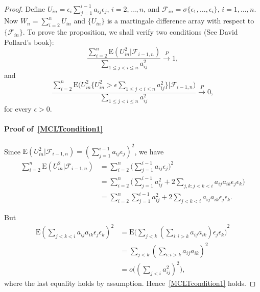 \documentclass[review]{elsarticle}
\theoremstyle{plain}
\theoremstyle{definition}
\theoremstyle{remark}
\begin{document}
 \begin{proof}
     Define $U_{in} =\epsilon_i \sum_{j=1}^{i-1} a_{ij}\epsilon_j$, $i=2,\ldots,n$, and $\mathcal{F}_{in}=\sigma\{\epsilon_1,\ldots,\epsilon_i\}$, $i=1,\ldots, n$.
     Now $W_n=\sum_{i=2}^n U_{in}$ and $\{U_{in}\}$ is a martingale difference array with respect to $\{\mathcal{F}_{in}\}$. 
     To prove the proposition, we shall verify two conditions (See David Pollard's book):
     \begin{equation}\label{MCLTcondition1}
         \frac{\sum_{i=2}^n \mathrm{E}(U_{in}^2 |\mathcal{F}_{i-1,n})}{\sum_{1\leq j<i\leq n} a_{ij}^2}\xrightarrow{P} 1,
     \end{equation}
     and
     \begin{equation}\label{MCLTcondition2}
         \frac{\sum_{i=2}^n \mathrm{E}\big(U_{in}^2\big\{U_{in}^2>\epsilon \sum_{1\leq j<i\leq n} a_{ij}^2\big\}\big|\mathcal{F}_{i-1,n}\big)}{\sum_{1\leq j<i\leq n} a_{ij}^2}\xrightarrow{P} 0,
     \end{equation}
     for every $\epsilon>0$.

     \paragraph{Proof of~\eqref{MCLTcondition1}}
     Since $\mathrm{E}(U_{in}^2 |\mathcal{F}_{i-1,n})={(\sum_{j=1}^{i-1}a_{ij}\epsilon_j)}^2$, we have
     \begin{equation*}
         \begin{aligned}
\sum_{i=2}^n \mathrm{E}(U_{in}^2 |\mathcal{F}_{i-1,n})
             &=\sum_{i=2}^n \big(\sum_{j=1}^{i-1}a_{ij}\epsilon_j \big)^2\\
             &=\sum_{i=2}^n \big( \sum_{j=1}^{i-1} a_{ij}^2 +2\sum_{j,k:j<k<i} a_{ij}a_{ik}\epsilon_j \epsilon_k \big)\\
             &=\sum_{i=2}^n  \sum_{j=1}^{i-1} a_{ij}^2 +2\sum_{j<k<i} a_{ij}a_{ik}\epsilon_j \epsilon_k.
         \end{aligned}
     \end{equation*}

     But
     \begin{equation*}
         \begin{aligned}
         \mathrm{E}{(\sum_{j<k<i} a_{ij}a_{ik}\epsilon_j \epsilon_k)}^2
             &=
             \mathrm{E}{\big(\sum_{j<k} (\sum_{i:i>k}a_{ij}a_{ik})\epsilon_j \epsilon_k \big)}^2\\
             &=
             \sum_{j<k} (\sum_{i:i>k}a_{ij}a_{ik})^2\\
             &=
             o\big({(\sum_{j<i} a_{ij}^2)}^2\big),
         \end{aligned}
     \end{equation*}
     where the last equality holds by assumption. Hence~\eqref{MCLTcondition1} holds.

\end{proof}
\end{document}
